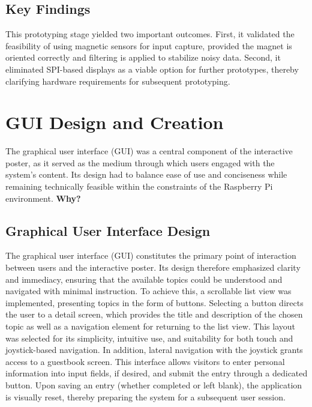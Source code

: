 	\subsection{Key Findings}
	This prototyping stage yielded two important outcomes. First, it validated the feasibility of using magnetic sensors for input capture, provided the magnet is oriented correctly and filtering is applied to stabilize noisy data. Second, it eliminated SPI-based displays as a viable option for further prototypes, thereby clarifying hardware requirements for subsequent prototyping.


\section{GUI Design and Creation}

The graphical user interface (GUI) was a central component of the interactive poster, as it served as the medium through which users engaged with the system's content. Its design had to balance ease of use and conciseness while remaining technically feasible within the constraints of the Raspberry Pi environment. \textbf{Why?}

\subsection{Graphical User Interface Design}
The graphical user interface (GUI) constitutes the primary point of interaction between users and the interactive poster. Its design therefore emphasized clarity and immediacy, ensuring that the available topics could be understood and navigated with minimal instruction. To achieve this, a scrollable list view was implemented, presenting topics in the form of buttons. Selecting a button directs the user to a detail screen, which provides the title and description of the chosen topic as well as a navigation element for returning to the list view. This layout was selected for its simplicity, intuitive use, and suitability for both touch and joystick-based navigation.
In addition, lateral navigation with the joystick grants access to a guestbook screen. This interface allows visitors to enter personal information into input fields, if desired, and submit the entry through a dedicated button. Upon saving an entry (whether completed or left blank), the application is visually reset, thereby preparing the system for a subsequent user session.

